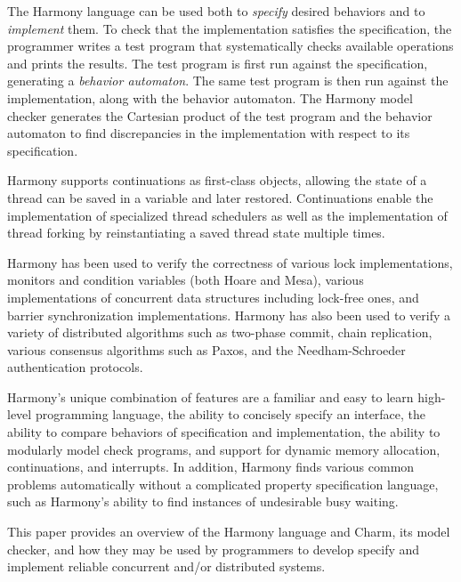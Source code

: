 \documentclass[twocolumn]{article}
\begin{document}
The Harmony language can be used both to \emph{specify} desired
behaviors and to \emph{implement} them.  To check that the implementation
satisfies the specification, the programmer writes a test program that
systematically checks available operations and prints the results.
The test program is first run against the specification, generating
a \emph{behavior automaton}.  The same test program is then run
against the implementation, along with the behavior automaton.
The Harmony model checker generates the Cartesian product of the test program
and the behavior automaton to find discrepancies in the implementation
with respect to its specification.

Harmony supports continuations as first-class objects, allowing the
state of a thread can be saved in a variable and later restored.
Continuations enable the implementation of specialized thread
schedulers as well as the implementation of thread forking by
reinstantiating a saved thread state multiple times.

Harmony has been used to verify the correctness of various lock
implementations, monitors and condition variables (both Hoare and Mesa),
various implementations of concurrent data structures including lock-free
ones, and barrier synchronization implementations.  Harmony has also been
used to verify a variety of distributed algorithms such as two-phase
commit, chain replication, various consensus algorithms such as Paxos,
and the Needham-Schroeder authentication protocols.

Harmony's unique combination of features are a familiar and easy
to learn high-level programming language, the ability to concisely
specify an interface, the ability to compare behaviors of specification
and implementation, the ability to modularly model check programs,
and support for dynamic memory allocation, continuations, and
interrupts.  In addition, Harmony finds various common problems
automatically without a complicated property specification language,
such as Harmony's ability to find instances of undesirable busy
waiting.

This paper provides an overview of the Harmony language and Charm,
its model checker, and how they may be used by programmers to
develop specify and implement reliable concurrent and/or
distributed systems.
\end{document}
